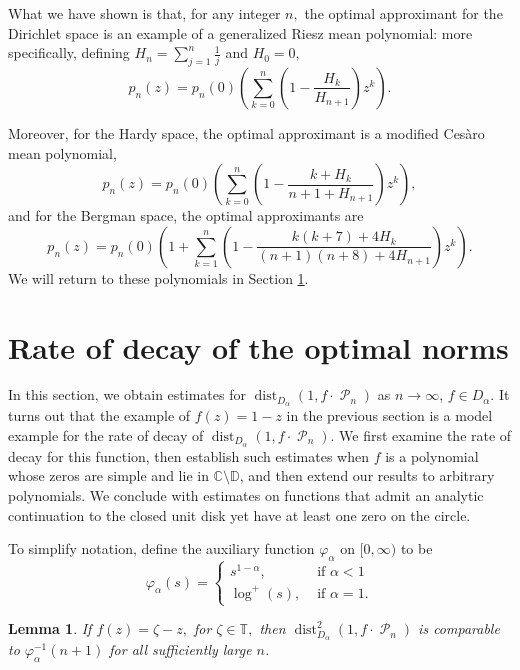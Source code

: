 \documentclass[11 pt,reqno]{amsart}
\newtheorem{lem}[thm]{Lemma}
\theoremstyle{definition}
\theoremstyle{remark}
\numberwithin{equation}{section} \numberwithin{figure}{section}
\newcommand{\CC}{{\mathbb C}}
\newcommand{\DD}{{\mathbb D}}
\newcommand{\TT}{{\mathbb T}}
\DeclareMathOperator{\Pol}{{\mathcal P}}
\DeclareMathOperator{\dist}{dist}
\begin{document}
What we have shown is that, for any integer $n,$ the optimal approximant for the Dirichlet space is an example of a generalized
Riesz mean polynomial: more specifically, defining
$H_{n}=\sum_{j=1}^{n}\frac{1}{j}$ and $H_0 = 0,$
$$ p_n(z) = p_{n}(0) \left(\sum_{k=0}^{n}\left(1-\frac{H_{k}}{H_{n+1}}\right)z^{k}\right).$$

Moreover, for the Hardy space, the optimal
approximant is a modified Ces\`{a}ro mean polynomial,
$$ p_n(z) =  p_{n}(0)\left(\sum_{k=0}^{n}
                  \left(1-\frac{k+H_{k}}{n+1+H_{n+1}}\right)z^{k}\right),$$
and for the Bergman space, the optimal approximants are
$$ p_n(z) = p_{n}(0)\left(1+\sum_{k=1}^{n}
                  \left(1-\frac{k(k+7)+4H_{k}}{(n+1)(n+8)+4H_{n+1}}\right)z^{k}\right).$$
We will return to these polynomials in Section
\ref{OptimalNormBounds}.



\section{Rate of decay of the optimal norms}\label{OptimalNormBounds}


In this section, we obtain estimates for $\dist_{D_{\alpha}}(1,f\cdot\Pol_{n})$
as $n\rightarrow\infty$, $f\in D_{\alpha}$.  It turns out that the example of $f(z) = 1-z$
in the previous section is a model example for the rate of decay of $\dist_{D_{\alpha}}(1,f\cdot\Pol_{n})$.  We first examine the rate of decay
for this function, then establish such estimates
when $f$ is a polynomial whose zeros are simple and lie in $\CC\setminus\DD$, and then
extend our results to arbitrary polynomials. We conclude with estimates on functions that
admit an analytic continuation to the closed unit disk yet have at least one zero on the circle.

To simplify notation, define the auxiliary function
$\varphi_{\alpha}$ on $[0,\infty)$ to be
\[  \varphi_{\alpha}(s)=\left\{
        \begin{array}{ll}
                    s^{1-\alpha},\;&\text{ if }\alpha<1\\
                    \log^+(s),&\text{ if }\alpha=1.
        \end{array}\right.  \]


\begin{lem}\label{sharp1}
If $f(z) = \zeta - z,$ for $\zeta \in \TT,$ then $\dist_{D_{\alpha}}^{2}(1,f\cdot\Pol_{n})$ is comparable to
$\varphi_{\alpha}^{-1}(n+1)$ for all sufficiently large $n$.
\end{lem}
\end{document}
